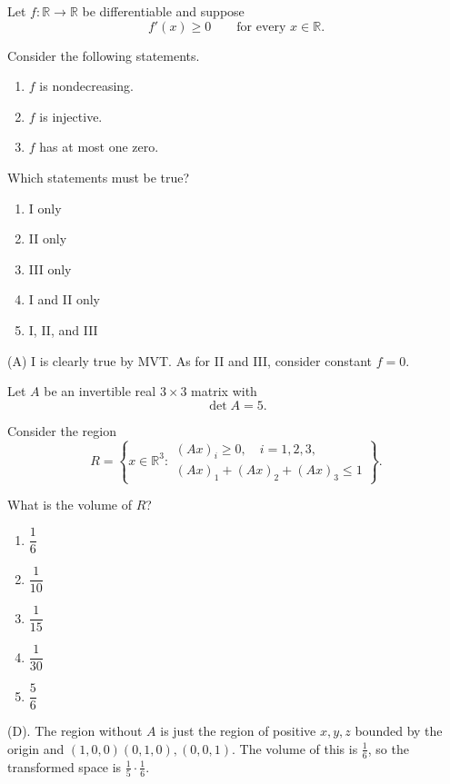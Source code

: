 \begin{exercise}
Let $f:\mathbb R\to\mathbb R$ be
differentiable and suppose
\[
f'(x)\ge0
\qquad\text{for every }x\in\mathbb R.
\]

Consider the following statements.

\begin{enumerate}[label=\Roman*.]
    \item $f$ is nondecreasing.
    \item $f$ is injective.
    \item $f$ has at most one zero.
\end{enumerate}

Which statements must be true?

\begin{enumerate}[label=(\Alph*)]
    \item I only
    \item II only
    \item III only
    \item I and II only
    \item I, II, and III
\end{enumerate}
\end{exercise}
\begin{solution}
(A) I is clearly true by MVT. As for II and III, consider constant $f = 0$.
\end{solution}


\begin{exercise}
Let $A$ be an invertible real
$3\times3$ matrix with
\[
\det A=5.
\]

Consider the region
\[
R=
\left\{
x\in\mathbb R^3:
\begin{array}{l}
(Ax)_i\ge0,\quad i=1,2,3,\\
(Ax)_1+(Ax)_2+(Ax)_3\le1
\end{array}
\right\}.
\]

What is the volume of $R$?

\begin{enumerate}[label=(\Alph*)]
    \item $\dfrac16$
    \item $\dfrac1{10}$
    \item $\dfrac1{15}$
    \item $\dfrac1{30}$
    \item $\dfrac56$
\end{enumerate}
\end{exercise}
\begin{solution}
(D). The region without $A$ is just the region of positive $x,y,z$ bounded by the origin
and $(1,0,0) (0,1,0), (0,0,1)$. The volume of this is $\frac{1}{6}$, so the transformed 
space is $\frac{1}{5 }\cdot \frac{1}{6}$.
\end{solution}

